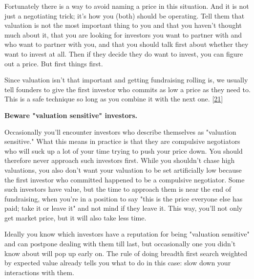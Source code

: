 Fortunately there is a way to avoid naming
                    a price in this situation. And it is not just a negotiating
                    trick; it's how you (both) should be operating. Tell them
                    that valuation is not the most important thing to you and
                    that you haven't thought much about it, that you are looking
                    for investors you want to partner with and who want to
                    partner with you, and that you should talk first about
                    whether they want to invest at all. Then if they decide they
                    do want to invest, you can figure out a price. But first
                    things first.

Since valuation isn't that
                    important and getting fundraising rolling is, we usually
                    tell founders to give the first investor who commits as low
                    a price as they need to. This is a safe technique so long as
                    you combine it with the next one.
                    [\href{\#f21n}{21}]


                    \textbf{Beware "valuation sensitive" investors.}

Occasionally you'll encounter investors who
                    describe themselves as "valuation sensitive." What this
                    means in practice is that they are compulsive negotiators
                    who will suck up a lot of your time trying to push your
                    price down. You should therefore never approach such
                    investors first. While you shouldn't chase high valuations,
                    you also don't want your valuation to be set artificially
                    low because the first investor who committed happened to be
                    a compulsive negotiator. Some such investors have value, but
                    the time to approach them is near the end of fundraising,
                    when you're in a position to say "this is the price everyone
                    else has paid; take it or leave it" and not mind if they
                    leave it. This way, you'll not only get market price, but it
                    will also take less time.

Ideally you know which
                    investors have a reputation for being "valuation sensitive"
                    and can postpone dealing with them till last, but
                    occasionally one you didn't know about will pop up early on.
                    The rule of doing breadth first search weighted by expected
                    value already tells you what to do in this case: slow down
                    your interactions with them.

